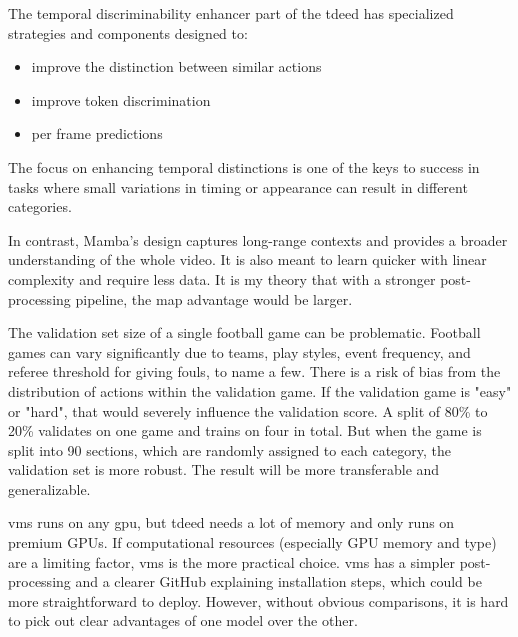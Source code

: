 The temporal discriminability enhancer part of the \acrfull{tdeed} has specialized strategies and components designed to:
\begin{itemize}
    \item improve the distinction between similar actions
    \item improve token discrimination
    \item per frame predictions
\end{itemize}

The focus on enhancing temporal distinctions is one of the keys to success in tasks where small variations in timing or appearance can result in different categories. 


In contrast, Mamba's design captures long-range contexts and provides a broader understanding of the whole video. It is also meant to learn quicker with linear complexity and require less data. It is my theory that with a stronger post-processing pipeline, the \acrshort{map} advantage would be larger. 


The validation set size of a single football game can be problematic. Football games can vary significantly due to teams, play styles, event frequency, and referee threshold for giving fouls, to name a few. There is a risk of bias from the distribution of actions within the validation game. If the validation game is "easy" or "hard", that would severely influence the validation score. A split of 80\% to 20\% validates on one game and trains on four in total. But when the game is split into 90 sections, which are randomly assigned to each category, the validation set is more robust. The result will be more transferable and generalizable. 


\acrshort{vms} runs on any \acrshort{gpu}, but \acrshort{tdeed} needs a lot of memory and only runs on premium GPUs. If computational resources (especially GPU memory and type) are a limiting factor, \acrshort{vms} is the more practical choice. \acrshort{vms} has a simpler post-processing and a clearer GitHub explaining installation steps, which could be more straightforward to deploy. However, without obvious comparisons, it is hard to pick out clear advantages of one model over the other. 


